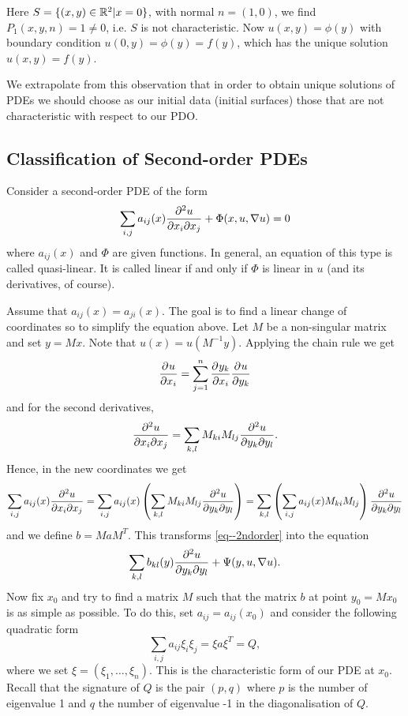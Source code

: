 \documentclass[11pt]{article}
\begin{document}
	            Here $S=\{(x,y)\in\R^2|x=0\}$, with normal $n=(1,0)$, we find $P_1(x,y,n)=1\neq0$, i.e. $S$ is not characteristic. Now $u(x,y)=\phi(y)$ with boundary condition $u(0,y)=\phi(y)=f(y)$, which has the unique solution $u(x,y)= f(y)$.

				We extrapolate from this observation that in order to obtain unique solutions of PDEs we should choose as our initial data (initial surfaces) those that are not characteristic with respect to our PDO.



			\subsection{Classification of Second-order PDEs}

				Consider a second-order PDE of the form
				\begin{equation}\label{eq--2ndorder}
					\sum_{i,j}a_{ij}(x)\del[2]{u}{x_i\partial x_j}+\Phi(x,u,\nabla u)=0
				\end{equation}
				where $a_{ij}(x)$ and $\Phi$ are given functions. In general, an equation of this type is called quasi-linear. It is called linear if and only if $\Phi$ is linear in $u$ (and its derivatives, of course).

				Assume that $a_{ij}(x)=a_{ji}(x)$. The goal is to find a linear change of coordinates so to simplify the equation above. Let $M$ be a non-singular matrix and set $y=Mx$. Note that $u(x)=u(M^{-1}y)$. Applying the chain rule we get
				\begin{equation*}
					\del[]{u}{x_i}=\sum_{j=1}^n\del[]{y_k}{x_i}\del[]{u}{y_k}
				\end{equation*}
				and for the second derivatives,
				\begin{equation*}
					\del[2]{u}{x_i\partial x_j}=\sum_{k,l}M_{ki}M_{lj}\del[2]{u}{y_k\partial y_l}.
				\end{equation*}
				Hence, in the new coordinates we get
				\begin{equation*}
					\sum_{i,j}a_{ij}(x)\del[2]{u}{x_i\partial x_j}=\sum_{i,j}a_{ij}(x)\left(\sum_{k,l}M_{ki}M_{lj}\del[2]{u}{y_k\partial y_l}\right)=\sum_{k,l}\left(\sum_{i,j}a_{ij}(x)M_{ki}M_{lj}\right)\del[2]{u}{y_k\partial y_l}
				\end{equation*}
				and we define $b=MaM^T$. 
				This transforms \eqref{eq--2ndorder} into the equation
				\begin{equation*}
					\sum_{k,l}b_{kl}(y)\del[2]{u}{y_k\partial y_l}+\Psi(y,u,\nabla u).
				\end{equation*}
				Now fix $x_0$ and try to find a matrix $M$ such that the matrix $b$ at point $y_0=Mx_0$ is as simple as possible. To do this, set $a_{ij}=a_{ij}(x_0)$ and consider the following quadratic form
				\begin{equation*}
					\sum_{i,j}a_{ij}\xi_i\xi_j=\xi a\xi^T=Q,
				\end{equation*}
				where we set $\xi=(\xi_1,\dots,\xi_n)$. This is the characteristic form of our PDE at $x_0$. Recall that the signature of $Q$ is the pair $(p,q)$ where $p$ is the number of eigenvalue 1 and $q$ the number of eigenvalue -1 in the diagonalisation of $Q$.
\end{document}
